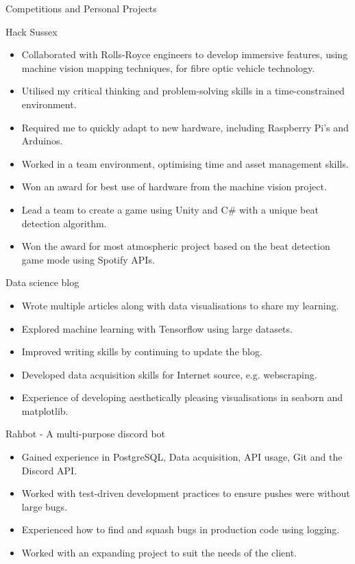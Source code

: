 \documentclass[a4paper]{article}
\newlength{\tabin}
\newlength{\secsep}
\newcommand{\lineunder}{\vspace*{-8pt} \\ \hspace*{-6pt} \hrulefill \\ \vspace*{-15pt}}
\newenvironment{tabbedsection}[1]{
  \begin{list}{}{
      \setlength{\itemsep}{0pt}
      \setlength{\labelsep}{0pt}
      \setlength{\labelwidth}{0pt}
      \setlength{\leftmargin}{\tabin}
      \setlength{\rightmargin}{\tabin}
      \setlength{\listparindent}{0pt}
      \setlength{\parsep}{0pt}
      \setlength{\parskip}{0pt}
      \setlength{\partopsep}{0pt}
      \setlength{\topsep}{#1}
    }
  \item[]
}{\end{list}}
\newenvironment{resume_section}[1]{
  \filbreak
  \vspace{2\secsep}
  \textsc{\large#1}
  \lineunder
  \begin{tabbedsection}{\secsep}
}{\end{tabbedsection}}
\newenvironment{resume_subsection}[2][]{
  \textbf{#2} \hfill {\footnotesize #1} \hspace{2em}
  \begin{tabbedsection}{0.5\secsep}
}{\end{tabbedsection}}
\newenvironment{subitems}{
  \renewcommand{\labelitemi}{-}
  \begin{itemize}
      \setlength{\labelsep}{1em}
}{\end{itemize}}
\begin{document}
\begin{resume_section}{Competitions and Personal Projects}
  \begin{resume_subsection}[(November 2018 \& 2019)]{Hack Sussex}
    \begin{subitems}
    \item Collaborated with Rolls-Royce engineers to develop immersive features, using machine vision mapping techniques, for fibre optic vehicle technology. 
    \item Utilised my critical thinking and problem-solving skills in a time-constrained environment.
    \item Required me to quickly adapt to new hardware, including Raspberry Pi's and Arduinos.
    \item Worked in a team environment, optimising time and asset management skills.
    \item Won an award for best use of hardware from the machine vision project.
    \item Lead a team to create a game using Unity and C\# with a unique beat detection algorithm.
    \item Won the award for most atmospheric project based on the beat detection game mode using Spotify APIs.
    \end{subitems}
  \end{resume_subsection}

    \begin{resume_subsection}{Data science blog}
    \begin{subitems}
        \item Wrote multiple articles along with data visualisations to share my learning.
        \item Explored machine learning with Tensorflow using large datasets.
        \item Improved writing skills by continuing to update the blog.
        \item Developed data acquisition skills for Internet source, e.g. webscraping.
        \item Experience of developing aesthetically pleasing visualisations in seaborn and matplotlib.
    \end{subitems}
  \end{resume_subsection}
  
  
   \begin{resume_subsection}{Rahbot - A multi-purpose discord bot}
    \begin{subitems}
        \item Gained experience in PostgreSQL, Data acquisition, API usage, Git and the Discord API.
        \item Worked with test-driven development practices to ensure pushes were without large bugs.
        \item Experienced how to find and squash bugs in production code using logging.
        \item Worked with an expanding project to suit the needs of the client.
    \end{subitems}
  \end{resume_subsection}
\end{resume_section}
\end{document}
